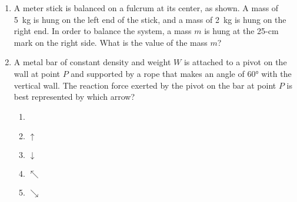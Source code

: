\documentclass{../../../oss-classkick}
\begin{document}
\begin{multicols}{2}
\begin{enumerate}[leftmargin=18pt]
  \item A meter stick is balanced on a fulcrum at its center, as shown. A mass
    of \SI{5}{\kilo\gram} is hung on the left end of the stick, and a mass of
    \SI{2}{\kilo\gram} is hung on the right end. In order to balance the
    system, a mass $m$ is hung at the 25-cm mark on the right
    side. What is the value of the mass $m$?
    \begin{center}
    \end{center}


  \item A metal bar of constant density and weight $W$ is attached to a pivot on
    the wall at point $P$ and supported by a rope that makes an angle of
    \ang{60} with the vertical wall. The reaction force exerted by the pivot on
    the bar at point $P$ is best represented by which arrow?
    \begin{enumerate}[topsep=0pt,itemsep=3pt,leftmargin=18pt,label=(\Alph*)]
    \item\vspace{-.15in}{\LARGE $\nearrow$}
    \item{\LARGE $\uparrow$}
    \item{\LARGE $\downarrow$}
    \item{\LARGE $\nwarrow$}
    \item{\LARGE $\searrow$}
    \end{enumerate}
    

\end{enumerate}
\end{multicols}
\end{document}
